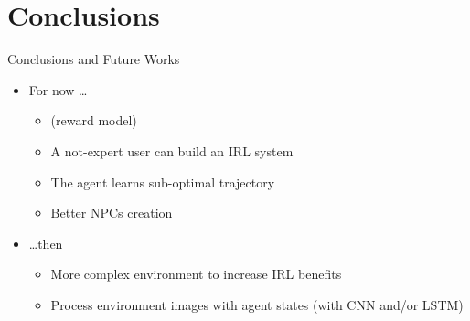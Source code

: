 \section{Conclusions}

\begin{frame}{Conclusions and Future Works}

\begin{itemize}
	\item For now \ldots
	\begin{itemize}
		\item (reward model)
		\item A not-expert user can build an IRL system
		\item The agent learns sub-optimal trajectory 
		\item Better NPCs creation
	\end{itemize}
	\vspace{0.5cm}
	\item \ldots then
	\begin{itemize}
		\item More complex environment to increase IRL benefits
		\item Process environment images with agent states (with CNN and/or LSTM)
	\end{itemize}
\end{itemize}

\end{frame}
